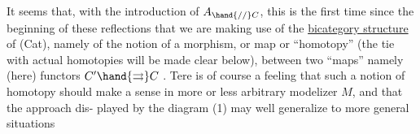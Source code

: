 It seems that,  with the introduction of $A_{\hand{//}C}$,  this is the first
time since the beginning of these reflections that  we are making use of
the \uline{bicategory structure} of (Cat),  namely of the notion of a morphism,
or map or ``homotopy'' (the tie with actual homotopies will be made clear
below),  between two ``maps'' namely (here) functors  $C' \hand{\rightrightarrows} C$ .  Tere is
of course a feeling that such a notion of homotopy should make a sense in
  more or less arbitrary modelizer $M$,  and that the approach dis-%
played by the diagram (1) may well generalize to more general situations

